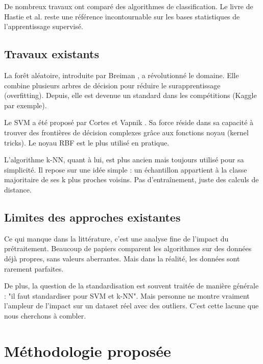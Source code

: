 \documentclass[conference]{IEEEtran}
\begin{document}
De nombreux travaux ont comparé des algorithmes de classification. Le livre de Hastie et al. \cite{hastie2009elements} reste une référence incontournable sur les bases statistiques de l'apprentissage supervisé.

\subsection{Travaux existants}

La forêt aléatoire, introduite par Breiman \cite{breiman2001random}, a révolutionné le domaine. Elle combine plusieurs arbres de décision pour réduire le surapprentissage (overfitting). Depuis, elle est devenue un standard dans les compétitions (Kaggle par exemple).

Le SVM a été proposé par Cortes et Vapnik \cite{cortes1995support}. Sa force réside dans sa capacité à trouver des frontières de décision complexes grâce aux fonctions noyau (kernel tricks). Le noyau RBF est le plus utilisé en pratique.

L'algorithme k-NN, quant à lui, est plus ancien mais toujours utilisé pour sa simplicité. Il repose sur une idée simple : un échantillon appartient à la classe majoritaire de ses k plus proches voisins. Pas d'entraînement, juste des calculs de distance.

\subsection{Limites des approches existantes}

Ce qui manque dans la littérature, c'est une analyse fine de l'impact du prétraitement. Beaucoup de papiers comparent les algorithmes sur des données déjà propres, sans valeurs aberrantes. Mais dans la réalité, les données sont rarement parfaites.

De plus, la question de la standardisation est souvent traitée de manière générale : "il faut standardiser pour SVM et k-NN". Mais personne ne montre vraiment l'ampleur de l'impact sur un dataset réel avec des outliers. C'est cette lacune que nous cherchons à combler.


\section{Méthodologie proposée}
\end{document}
